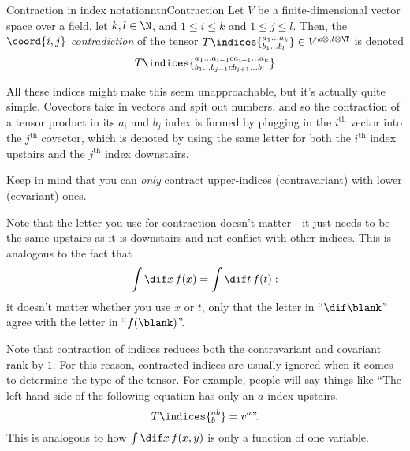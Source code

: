 \begin{ntn}{Contraction in index notation}{ntnContraction}
	Let $V$ be a finite-dimensional vector space over a field, let $k,l\in \N$, and $1\leq i\leq k$ and $1\leq j\leq l$.  Then, the $\coord{i,j}$ \emph{contradiction} of the tensor $T\indices{^{a_1\ldots a_k}_{b_1\ldots b_l}}\in V^{k\otimes ,l\otimes \T}$ is denoted
	\begin{equation}
		T\indices{^{a_1\ldots a_{i-1}ca_{i+1}\ldots a_k}_{b_1\ldots b_{j-1}cb_{j+1}\ldots b_l}}
	\end{equation}
	\begin{rmk}
		All these indices might make this seem unapproachable, but it's actually quite simple.  Covectors take in vectors and spit out numbers, and so the contraction of a tensor product in its $a_i$ and $b_j$ index is formed by plugging in the $i^{\text{th}}$ vector into the $j^{\text{th}}$ covector, which is denoted by using the same letter for both the $i^{\text{th}}$ index upstairs and the $j^{\text{th}}$ index downstairs.
	\end{rmk}
	\begin{rmk}
		Keep in mind that you can \emph{only} contract upper-indices (contravariant) with lower (covariant) ones.
	\end{rmk}	
	\begin{rmk}
		Note that the letter you use for contraction doesn't matter---it just needs to be the same upstairs as it is downstairs and not conflict with other indices.  This is analogous to the fact that
		\begin{equation}
			\int \dif x\, f(x)=\int \dif t\, f(t):
		\end{equation}
		it doesn't matter whether you use $x$ or $t$, only that the letter in ``$\dif \blank$'' agree with the letter in ``$f(\blank )$''.
	\end{rmk}
	\begin{rmk}
		Note that contraction of indices reduces both the contravariant and covariant rank by $1$.  For this reason, contracted indices are usually ignored when it comes to determine the type of the tensor.  For example, people will say things like ``The left-hand side of the following equation has only an $a$ index upstairs.
		\begin{equation}
			T\indices{^{ab}_b}=v^a\text{''.}
		\end{equation}
		This is analogous to how $\int \dif x\, f(x,y)$ is only a function of one variable.
	\end{rmk}
\end{ntn}
